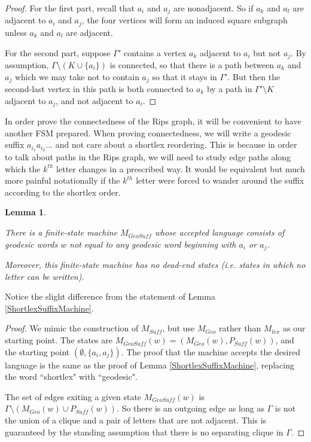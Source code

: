 \documentclass[10pt,a4paper]{amsart}
\newtheorem{lemma}[theorem]{Lemma}
\theoremstyle{definition}
\theoremstyle{remark}
\begin{document}
	\begin{proof}
		
		For the first part, recall that $a_i$ and $a_j$ are nonadjacent. So if $a_k$ and $a_l$ are adjacent to $a_i$ and $a_j$, the four vertices will form an induced square subgraph unless $a_k$ and $a_l$ are adjacent.
		
		For the second part, suppose $\Gamma'$ contains a vertex $a_k$ adjacent to $a_i$ but not $a_j$. By assumption, $\Gamma\setminus (K\cup\{a_i\})$ is connected, so that there is a path between $a_k$ and $a_j$ which we may take not to contain $a_j$ so that it stays in $\Gamma'$. But then the second-last vertex in this path is both connected to $a_k$ by a path in $\Gamma'\setminus K$ adjacent to $a_j$, and not adjacent to $a_i$.
	\end{proof}
	
	In order prove the connectedness of the Rips graph, it will be convenient to have another FSM prepared. When proving connectedness, we will write a geodesic suffix  $a_{i_1}a_{i_2}...$ and not care about a shortlex reordering. This is because in order to talk about paths in the Rips graph, we will need to study edge paths along which the $k^{th}$ letter changes in a prescribed way. It would be equivalent but much more painful notationally if the $k^{th}$ letter were forced to wander around the suffix according to the shortlex order.
	
	
	\begin{lemma}\label{GeoSuffMachine}
		
		There is a finite-state machine $M_{GeoSuff}$ whose accepted language consists of geodesic words $w$ not equal to any geodesic word beginning with $a_i$ or $a_j$.
		
		Moreover, this finite-state machine has no dead-end states (i.e. states in which no letter can be written).
		
	\end{lemma}
	
	Notice the slight difference from the statement of Lemma \ref{ShortlexSuffixMachine}.
	
	\begin{proof}
		
		We mimic the construction of $M_{Suff}$, but use $M_{Geo}$ rather than $M_{lex}$ as our starting point. The states are $M_{GeoSuff}(w)=(M_{Geo}(w),P_{Suff}(w))$, and the starting point $(\emptyset, \{a_i, a_j\})$. The proof that the machine accepts the desired language is the same as the proof of Lemma \ref{ShortlexSuffixMachine}, replacing the word ``shortlex" with ``geodesic".
		
		The set of edges exiting a given state $M_{GeoSuff}(w)$ is $\Gamma\setminus (M_{Geo}(w)\cup P_{Suff}(w))$. So there is an outgoing edge as long as $\Gamma$ is not the union of a clique and a pair of letters that are not adjacent. This is guaranteed by the standing assumption that there is no separating clique in $\Gamma$.
	\end{proof}
	
\end{document}
